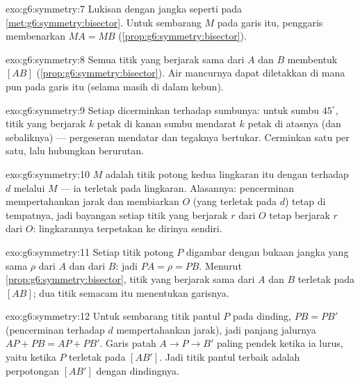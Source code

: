 \begin{solution}{exo:g6:symmetry:7}
Lukisan dengan jangka seperti pada \cref{met:g6:symmetry:bisector}.
Untuk sembarang $M$ pada garis itu, penggaris membenarkan $MA = MB$
(\cref{prop:g6:symmetry:bisector}).
\end{solution}

\begin{solution}{exo:g6:symmetry:8}
Semua titik yang berjarak sama dari $A$ dan $B$ membentuk 
$[AB]$ (\cref{prop:g6:symmetry:bisector}). Air mancurnya dapat
diletakkan di mana pun pada garis itu (selama masih di dalam kebun).
\end{solution}

\begin{solution}{exo:g6:symmetry:9}
Setiap  dicerminkan  terhadap sumbunya: untuk
sumbu $45^\circ$, titik yang berjarak $k$ petak di kanan sumbu
mendarat $k$ petak di atasnya (dan sebaliknya) --- pergeseran mendatar
dan tegaknya bertukar. Cerminkan  satu per satu, lalu
hubungkan berurutan.
\end{solution}

\begin{solution}{exo:g6:symmetry:10}
 $M$ adalah titik potong kedua lingkaran itu dengan  terhadap $d$ melalui $M$ --- ia terletak pada lingkaran.
Alasannya: pencerminan mempertahankan jarak dan membiarkan $O$ (yang
terletak pada $d$) tetap di tempatnya, jadi bayangan setiap titik yang berjarak $r$
dari $O$ tetap berjarak $r$ dari $O$: lingkarannya terpetakan ke
dirinya sendiri.
\end{solution}

\begin{solution}{exo:g6:symmetry:11}
Setiap titik potong $P$ digambar dengan bukaan jangka yang sama
$\rho$ dari $A$ dan dari $B$: jadi $PA = \rho = PB$. Menurut
\cref{prop:g6:symmetry:bisector}, titik yang berjarak sama dari $A$
dan $B$ terletak pada  $[AB]$; dua titik semacam itu
menentukan garisnya.
\end{solution}

\begin{solution}{exo:g6:symmetry:12}
Untuk sembarang titik pantul $P$ pada dinding, $PB = PB'$
(pencerminan terhadap $d$ mempertahankan jarak), jadi panjang
jalurnya $AP + PB = AP + PB'$. Garis patah $A \to P \to B'$ paling
pendek ketika ia lurus, yaitu ketika $P$ terletak pada 
$[AB']$. Jadi titik pantul terbaik adalah perpotongan $[AB']$ dengan dindingnya.
\end{solution}

